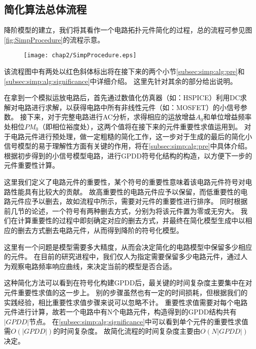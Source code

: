 \subsection{简化算法总体流程}
\label{subsec:simp:alg:top}

降阶模型的建立，我们将其看作一个电路拓扑元件简化的过程，总的流程可参见图\ref{fig:SimpProcedure}的流程示意。

\begin{figure}[!htp]
	\centering
	\texttt{[image: chap2/SimpProcedure.eps]}
\end{figure}

该流程图中有两处以红色斜体标出将在接下来的两个小节\ref{subsec:simp:alg:pre}和\ref{subsec:simp:alg:significance}中详细介绍。
这里先针对其余的部分给出说明。

在拿到一个模拟运放电路后，首先通过数值化仿真器（如：HSPICE）利用DC求解对电路进行求解，以获得电路中所有非线性元件（如：MOSFET）的小信号参数。
接下来，对于完整电路进行AC分析，求得相应的运放增益$A_0$和单位增益频率处相位$PM_0$（即相位裕度处），这两个值将在接下来的元件重要性求值运用到。
对于电路元件进行预处理，做一定粗糙的简化工作，这一步对于生成的最后的简化小信号模型的易于理解性方面有关键的作用，将在\ref{subsec:simp:alg:pre}中具体介绍。
根据初步得到的小信号模型电路，进行GPDD符号化结构的构造，以方便下一步的元件重要性计算。

这里我们定义了电路元件的重要性，某个符号的重要性意味着该电路元件符号对电路性能具有比较大的贡献。
故高重要性的电路元件应予以保留，而低重要性的电路元件应予以删去，故如流程中所示，需要对元件的重要性进行排序。
同时根据前几节的论述，一个符号有两种删去方式，分别为将该元件置为零或无穷大。
我们在计算重要性的过程中即刻确定对应的删去方式，并最终在简化模型生成中以相应的删去方式删去电路元件，从而得到降阶的符号化模型。

这里有一个问题是模型需要多大精度，从而会决定简化的电路模型中保留多少相应的元件。
在目前的研究进程中，我们仅人为指定需要保留多少电路元件，通过人为观察电路频率响应曲线，来决定当前的模型是否合适。

这种简化方法可以看到在符号化构建GPDD后，最关键的时间复杂度主要集中在对元件重要性求值的这一步上。
别的步骤虽然也有一定的时间损耗，但根据我们的实践经验，相比重要性求值步骤来说可以忽略不计。
重要性求值需要对每个电路元件进行计算，故若一个电路中有N个电路元件，构造得到的GPDD结构共有$\left|GPDD\right|$节点。
在\ref{subsec:simp:alg:significance}中可以看到单个元件的重要性求值需$O\left(\left|GPDD\right|\right)$的时间复杂度。
故简化流程的时间复杂度主要由$O\left(N\left|GPDD\right|\right)$决定。

